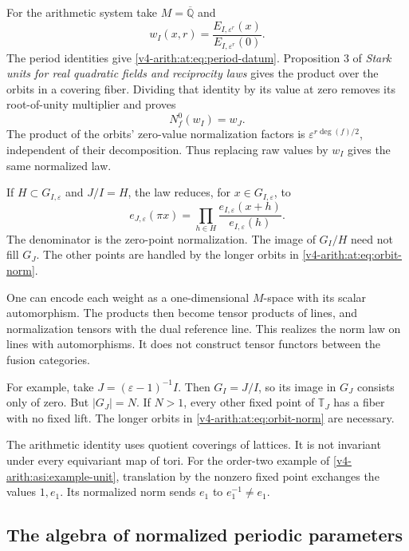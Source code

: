 For the arithmetic system take \(M=\overline{\mathbb Q}\) and
\[
 w_I(x,r)=\frac{E_{I,\varepsilon^r}(x)}
                    {E_{I,\varepsilon^r}(0)}.
\]
The period identities give \eqref{v4-arith:at:eq:period-datum}.
Proposition 3 of \emph{Stark units for real quadratic fields and
reciprocity laws} gives the product over the orbits in a covering
fiber. Dividing that identity by its value at zero removes its
root-of-unity multiplier and proves
\begin{equation}\label{v4-arith:at:eq:arithmetic-norm}
 N_f^0(w_I)=w_J.
\end{equation}
The product of the orbits' zero-value normalization factors is
\(\varepsilon^{r\deg(f)/2}\), independent of their decomposition.
Thus replacing raw values by \(w_I\) gives the same normalized law.

If \(H\subset G_{I,\varepsilon}\) and \(J/I=H\), the law reduces,
for \(x\in G_{I,\varepsilon}\), to
\begin{equation}\label{v4-arith:at:eq:subgroup-norm}
 e_{J,\varepsilon}(\pi x)
       =\prod_{h\in H}\frac{e_{I,\varepsilon}(x+h)}
                              {e_{I,\varepsilon}(h)}.
\end{equation}
The denominator is the zero-point normalization. The image of
\(G_I/H\) need not fill \(G_J\). The other points are handled by
the longer orbits in \eqref{v4-arith:at:eq:orbit-norm}.

One can encode each weight as a one-dimensional \(M\)-space with
its scalar automorphism. The products then become tensor products
of lines, and normalization tensors with the dual reference line.
This realizes the norm law on lines with automorphisms. It does
not construct tensor functors between the fusion categories.



For example, take \(J=(\varepsilon-1)^{-1}I\).
Then \(G_I=J/I\), so its image in \(G_J\) consists only of zero.
But \(|G_J|=N\). If \(N>1\), every other fixed point of
\(\mathbb T_J\) has a fiber with no fixed lift.
The longer orbits in \eqref{v4-arith:at:eq:orbit-norm} are necessary.

The arithmetic identity uses quotient coverings of lattices.
It is not invariant under every equivariant map of tori.
For the order-two example of \eqref{v4-arith:asi:example-unit},
translation by the nonzero fixed point exchanges the values
\(1,e_1\). Its normalized norm sends \(e_1\) to
\(e_1^{-1}\ne e_1\).

\subsection{The algebra of normalized periodic parameters}


